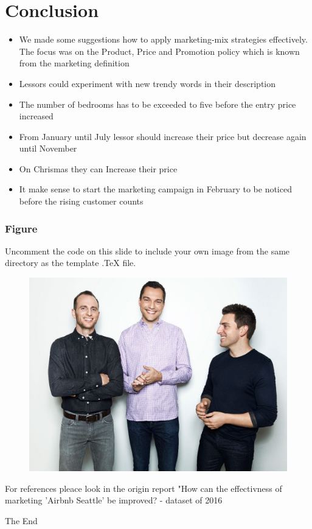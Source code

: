 \documentclass{beamer}
\begin{document}
\section{Conclusion}
\begin{frame}
\begin{itemize}
\item We made some suggestions how to apply marketing-mix strategies effectively. The focus was on the Product, Price and Promotion policy which is known from the marketing definition
\item Lessors could experiment with new trendy words in their description
\item The number of bedrooms has to be exceeded to five before the entry price increased

\end{itemize}
\end{frame}
\begin{frame}
\begin{itemize}
\item From January until July lessor should increase their price but decrease again until November
\item On Chrismas they can Increase their price
\item It make sense to start the marketing campaign in February to be noticed before the rising customer counts
\end{itemize}
\end{frame}

\begin{frame}
\frametitle{Figure}
Uncomment the code on this slide to include your own image from the same directory as the template .TeX file.
\begin{figure}
\includegraphics[width=0.6\linewidth]{photo/founders}
\end{figure}
\end{frame}
\begin{frame}
For references pleace look in the origin report "How can the effectivness of marketing 'Airbnb Seattle' be improved? - dataset of 2016 
\end{frame}
\begin{frame}
\Huge{\centerline{The End}}
\end{frame}
\end{document}
